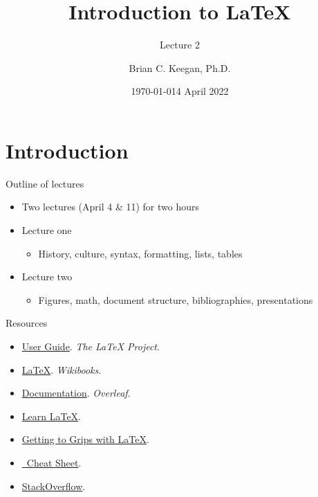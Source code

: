 \documentclass{cubeamer}
\title{Introduction to \LaTeX}
\subtitle{Lecture 2}
\author[B. Keegan]{Brian C. Keegan, Ph.D.}
\date{\today} %
\institute[Information Science]{Assistant Professor, Department of Information Science}
\date{4 April 2022}
\begin{document}
\maketitle


\section{Introduction}

\begin{frame}{Outline of lectures}
    \begin{itemize}
        \item Two lectures (April 4 \& 11) for two hours
        \item Lecture one
        \begin{itemize}
            \item History, culture, syntax, formatting, lists, tables
        \end{itemize}
        \item Lecture two
        \begin{itemize}
            \item Figures, math, document structure, bibliographies, presentations
        \end{itemize}
    \end{itemize}
\end{frame}

\begin{frame}{Resources}
    \begin{itemize}
        \item \href{https://www.latex-project.org/help/documentation/usrguide.pdf}{User Guide}. \textit{The \LaTeX{} Project}.
        \item \href{https://en.wikibooks.org/wiki/LaTeX}{\LaTeX}. \textit{Wikibooks}.
        \item \href{https://www.overleaf.com/learn}{Documentation}. \textit{Overleaf}.
        \item \href{https://www.learnlatex.org/en/}{Learn \LaTeX}.
        \item \href{https://www.andy-roberts.net/writing/latex}{Getting to Grips with \LaTeX}.
        \item \href{http://wch.github.io/latexsheet/latexsheet.pdf}{\LaTeXe~Cheat Sheet}.
        \item \href{https://tex.stackexchange.com/}{StackOverflow}.
    \end{itemize}
\end{frame}
\end{document}
